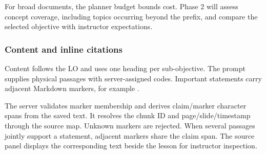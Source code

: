 For broad documents, the planner budget bounds cost. Phase 2 will assess concept coverage, including topics occurring beyond the prefix, and compare the selected objective with instructor expectations.
\subsubsection{Content and inline citations}
Content follows the LO and uses one heading per sub-objective. The prompt supplies physical passages with server-assigned codes. Important statements carry adjacent Markdown markers, for example .

The server validates marker membership and derives claim/marker character spans from the saved text. It resolves the chunk ID and page/slide/timestamp through the source map. Unknown markers are rejected. When several passages jointly support a statement, adjacent markers share the claim span. The source panel displays the corresponding text beside the lesson for instructor inspection.
\needspace{.55\textheight}
